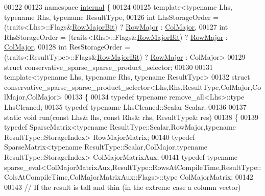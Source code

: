 \begin{DoxyCode}
00122 
00123 \textcolor{keyword}{namespace }\hyperlink{namespaceinternal}{internal} \{
00124 
00125 \textcolor{keyword}{template}<\textcolor{keyword}{typename} Lhs, \textcolor{keyword}{typename} Rhs, \textcolor{keyword}{typename} ResultType,
00126   \textcolor{keywordtype}{int} LhsStorageOrder = (traits<Lhs>::Flags&\hyperlink{group__flags_gae4f56c2a60bbe4bd2e44c5b19cbe8762}{RowMajorBit}) ? \hyperlink{group__enums_ggaacded1a18ae58b0f554751f6cdf9eb13acfcde9cd8677c5f7caf6bd603666aae3}{RowMajor} : 
      \hyperlink{group__enums_ggaacded1a18ae58b0f554751f6cdf9eb13a0cbd4bdd0abcfc0224c5fcb5e4f6669a}{ColMajor},
00127   \textcolor{keywordtype}{int} RhsStorageOrder = (traits<Rhs>::Flags&\hyperlink{group__flags_gae4f56c2a60bbe4bd2e44c5b19cbe8762}{RowMajorBit}) ? \hyperlink{group__enums_ggaacded1a18ae58b0f554751f6cdf9eb13acfcde9cd8677c5f7caf6bd603666aae3}{RowMajor} : 
      \hyperlink{group__enums_ggaacded1a18ae58b0f554751f6cdf9eb13a0cbd4bdd0abcfc0224c5fcb5e4f6669a}{ColMajor},
00128   \textcolor{keywordtype}{int} ResStorageOrder = (traits<ResultType>::Flags&\hyperlink{group__flags_gae4f56c2a60bbe4bd2e44c5b19cbe8762}{RowMajorBit}) ? 
      \hyperlink{group__enums_ggaacded1a18ae58b0f554751f6cdf9eb13acfcde9cd8677c5f7caf6bd603666aae3}{RowMajor} : ColMajor>
00129 \textcolor{keyword}{struct} conservative\_sparse\_sparse\_product\_selector;
00130 
00131 \textcolor{keyword}{template}<\textcolor{keyword}{typename} Lhs, \textcolor{keyword}{typename} Rhs, \textcolor{keyword}{typename} ResultType>
00132 \textcolor{keyword}{struct }conservative\_sparse\_sparse\_product\_selector<Lhs,Rhs,ResultType,ColMajor,ColMajor,ColMajor>
00133 \{
00134   \textcolor{keyword}{typedef} \textcolor{keyword}{typename} remove\_all<Lhs>::type LhsCleaned;
00135   \textcolor{keyword}{typedef} \textcolor{keyword}{typename} LhsCleaned::Scalar Scalar;
00136 
00137   \textcolor{keyword}{static} \textcolor{keywordtype}{void} run(\textcolor{keyword}{const} Lhs& lhs, \textcolor{keyword}{const} Rhs& rhs, ResultType& res)
00138   \{
00139     \textcolor{keyword}{typedef} SparseMatrix<typename ResultType::Scalar,RowMajor,typename ResultType::StorageIndex> 
      RowMajorMatrix;
00140     \textcolor{keyword}{typedef} SparseMatrix<typename ResultType::Scalar,ColMajor,typename ResultType::StorageIndex> 
      ColMajorMatrixAux;
00141     \textcolor{keyword}{typedef} \textcolor{keyword}{typename} 
      sparse\_eval<ColMajorMatrixAux,ResultType::RowsAtCompileTime,ResultType::ColsAtCompileTime,ColMajorMatrixAux::Flags>::type ColMajorMatrix;
00142     
00143     \textcolor{comment}{// If the result is tall and thin (in the extreme case a column vector)}

\end{DoxyCode}
